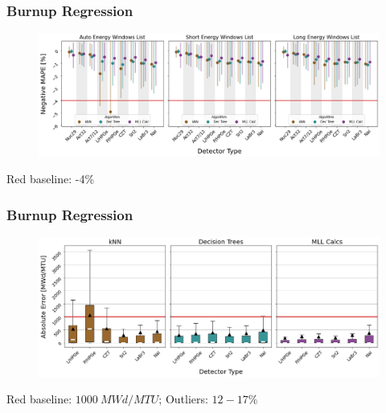 \begin{frame}
  \frametitle{Burnup Regression}
  \begin{adjustwidth}{-15pt}{-10pt}
  \begin{figure}
    \centering
    \includegraphics[width=1.1\textwidth]{./figures/detector_preds_wrt_enlist_MAPE_burn.png}
  \end{figure}
  \vspace{12pt} \centering Red baseline: -4\% 
  \end{adjustwidth}
\end{frame}

\begin{frame}
  \frametitle{Burnup Regression}
  \begin{adjustwidth}{-15pt}{-10pt}
  \begin{figure}
    \centering
    \includegraphics[width=1.1\textwidth]{./figures/abserror_boxplots_auto_burn.png}
  \end{figure}
  \vspace{12pt} \centering Red baseline: $1000\:MWd/MTU$; Outliers: $12-17\%$
  \end{adjustwidth}
\end{frame}

